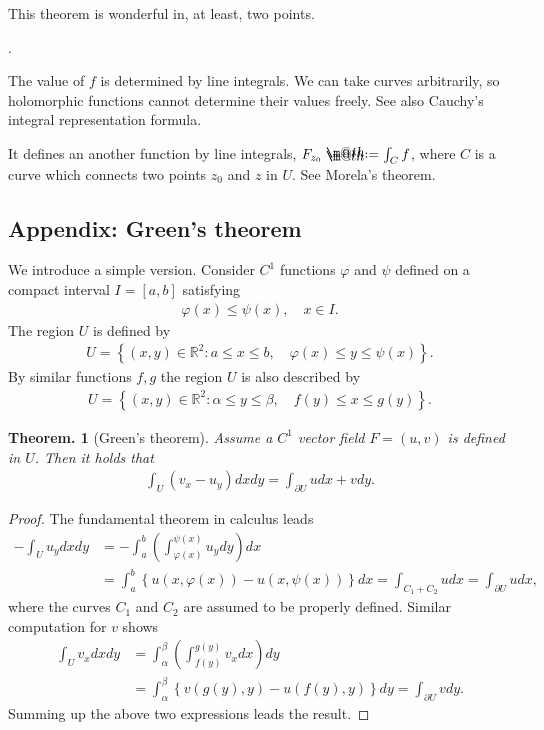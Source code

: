 \documentclass[openany, a4paper, oneside]{book}
\makeatletter
\newcounter{enum2}
\renewenvironment{enumerate}{%
\begin{list}%
{%
\arabic{enum2}.\ \,%
}%
{%
\usecounter{enum2}
\setlength{\itemindent}{0pt}%
\setlength{\leftmargin}{6pt}%
\setlength{\rightmargin}{0pt}%
\setlength{\labelsep}{0pt}%
\setlength{\labelwidth}{6pt}%
\setlength{\itemsep}{0pt}%
\setlength{\parsep}{0pt}%
\setlength{\listparindent}{0pt}%
}
}{%
\end{list}%
}
\newcommand*{\defeq}{\mathrel{\rlap{%
\raisebox{0.3ex}{$\m@th\cdot$}}%
\raisebox{-0.3ex}{$\m@th\cdot$}}%
=}
\theoremstyle{break}
\newtheorem{thm}{Theorem.}[section]
\theoremstyle{breakdefn}
\newcommand{\rbk}[1]{\left (#1\right)}
\newcommand{\cbk}[1]{\left\{#1\right\}}
\newcommand{\set}[2]{\left\{#1 : #2\right\}}
\newcommand{\bbR}{\mathbb{R}}
\makeatother
\begin{document}
This theorem is wonderful in, at least, two points.
\begin{enumerate}
\item The value of $f$ is determined by line integrals.
   We can take curves arbitrarily, so holomorphic functions cannot determine their values freely.
   See also Cauchy's integral representation formula.
\item It defines an another function by line integrals, $F_{z_0} \defeq \int_{C} f$, where $C$ is a curve which connects two points $z_0$ and $z$ in $U$.
   See Morela's theorem.
\end{enumerate}
\subsection{Appendix: Green's theorem}
\label{sec-6-1-3-1}

We introduce a simple version.
Consider $C^1$ functions $\varphi$ and $\psi$ defined on a compact interval $I=[a, b]$ satisfying
\begin{align}
 \varphi (x) \leq \psi (x), \quad x \in I.
\end{align}
The region $U$ is defined by
\begin{align}
 U
 =
 \set{(x,y) \in \bbR^2}{a \leq x \leq b, \quad \varphi (x) \leq y \leq \psi (x)}.
\end{align}
By similar functions $f, g$ the region $U$ is also described by
\begin{align}
 U
 =
 \set{(x,y) \in \bbR^2}{\alpha \leq y \leq \beta, \quad f (y) \leq x \leq g (y)}.
\end{align}
\begin{thm}[Green's theorem]
 Assume a $C^1$ vector field $F = (u, v)$ is defined in $U$.
 Then it holds that
 \begin{align}
  \int_U \rbk{v_x - u_y} dx dy
  =
  \int_{\partial U} udx + vdy.
 \end{align}
\end{thm}
\begin{proof}
The fundamental theorem in calculus leads
\begin{align}
 -\int_U u_y dx dy
 &=
 -\int_a^b \rbk{\int_{\varphi (x)}^{\psi (x)} u_y dy} dx \\
 &=
 \int_a^b \cbk{u (x, \varphi (x)) - u (x, \psi (x))} dx
 =
 \int_{C_1 + C_2} u dx
 =
 \int_{\partial U} u dx,
\end{align}
where the curves $C_1$ and $C_2$ are assumed to be properly defined.
Similar computation for $v$ shows
\begin{align}
 \int_U v_x dx dy
 &=
 \int_{\alpha}^{\beta} \rbk{\int_{f (y)}^{g (y)} v_x dx} dy \\
 &=
 \int_{\alpha}^{\beta} \cbk{v (g (y), y) - u (f (y), y)} dy
 =
 \int_{\partial U} v dy.
\end{align}
Summing up the above two expressions leads the result.
\end{proof}
\end{document}
